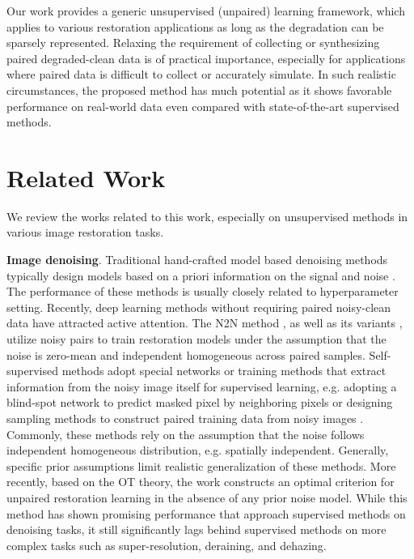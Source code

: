 \documentclass[10pt,journal,compsoc]{IEEEtran}
\begin{document}
Our work provides a generic unsupervised (unpaired) learning framework, 
which applies to various restoration applications as long as the degradation
can be sparsely represented. Relaxing the requirement 
of collecting or synthesizing paired degraded-clean data is 
of practical importance, especially for applications 
where paired data is difficult to collect or accurately simulate.
In such realistic circumstances, the proposed method has much potential
as it shows favorable performance on real-world data
even compared with state-of-the-art supervised methods.


\section{Related Work}

We review the works related to this work,
especially on unsupervised methods in various image restoration tasks.

\textbf{Image denoising}.
Traditional hand-crafted model based denoising methods 
typically design models based on a priori information on the signal and noise 
\cite{buades2005review, nlm, bm3d, lebrun2012analysis}. 
The performance of these methods is usually closely related to 
hyperparameter setting.
Recently, deep learning methods without requiring paired noisy-clean 
data have attracted active attention.
The N2N method \cite{n2n}, as well as its variants \cite{mbvd, nr2n, nac, gan2gan}, 
utilize noisy pairs to train restoration models under the assumption that
the noise is zero-mean and independent homogeneous across paired samples.
Self-supervised methods adopt special networks or training methods 
that extract information from the noisy image itself for supervised learning, 
e.g. adopting a blind-spot network to predict masked pixel by
neighboring pixels or designing sampling methods to construct paired training
data from noisy images 
\cite{n2v, n2s, s2s, neighbor2neighbor, krull2020probabilistic,laine2019high,wu2020unpaired}.
Commonly, these methods rely on the assumption that the 
noise follows independent homogeneous distribution, e.g. spatially independent.
Generally, specific prior assumptions limit realistic generalization of these methods.
More recently, based on the OT theory, the work \cite{wang2022optimal} constructs 
an optimal criterion for unpaired restoration learning in the
absence of any prior noise model. While this method has shown
promising performance that approach supervised methods on denoising 
tasks, it still significantly lags behind supervised methods on more
complex tasks such as super-resolution, deraining, and dehazing.
\end{document}
